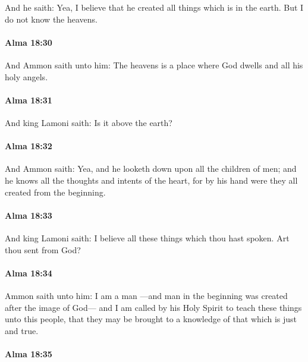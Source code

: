 			And he saith:
			Yea, I believe that he created all things which is in the earth.
			But I do not know the heavens.

		\paragraph{Alma 18:30} %
			\label{ALMA-18-30}

			And Ammon saith unto him:
			The heavens is a place where God dwells and all his holy angels.

		\paragraph{Alma 18:31} %
			\label{ALMA-18-31}

			And king Lamoni saith:
			Is it above the earth?

		\paragraph{Alma 18:32} %
			\label{ALMA-18-32}

			And Ammon saith:
			Yea, and he looketh down upon all the children of men;
			and he knows all the thoughts and intents of the heart,
			for by his hand were they all created from the beginning.

		\paragraph{Alma 18:33} %
			\label{ALMA-18-33}

			And king Lamoni saith:
			I believe all these things which thou hast spoken.
			Art thou sent from God?

		\paragraph{Alma 18:34} %
			\label{ALMA-18-34}

			Ammon saith unto him:
			I am a man
			---and man in the beginning was created after the image of God---
			and I am called by his Holy Spirit to teach these things unto this people,
			that they may be brought to a knowledge of that which is just and true.

		\paragraph{Alma 18:35} %
			\label{ALMA-18-35}

